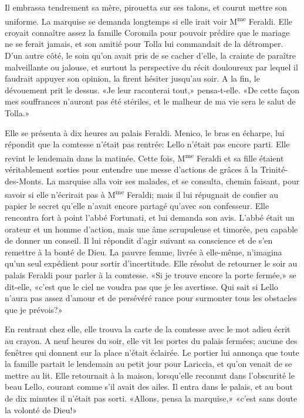 Il embrassa tendrement sa mère, pirouetta sur ses talons, et courut
mettre son uniforme. La marquise se demanda longtemps si elle irait voir
M\textsuperscript{me} Feraldi. Elle croyait connaître assez la famille
Coromila pour pouvoir prédire que le mariage ne se ferait jamais, et son
amitié pour Tolla lui commandait de la détromper. D'un autre côté, le
soin qu'on avait pris de se cacher d'elle, la crainte de paraître
malveillante ou jalouse, et surtout la perspective du récit douloureux
par lequel il faudrait appuyer son opinion, la firent hésiter jusqu'au
soir. A la fin, le dévouement prit le dessus. «Je leur raconterai tout,»
pensa-t-elle. «De cette façon mes souffrances n'auront pas été stériles,
et le malheur de ma vie sera le salut de Tolla.»

Elle se présenta à dix heures au palais Feraldi. Menico, le bras en
écharpe, lui répondit que la comtesse n'était pas rentrée: Lello n'était
pas encore parti. Elle revint le lendemain dans la matinée. Cette fois,
M\textsuperscript{me} Feraldi et sa fille étaient véritablement sorties
pour entendre une messe d'actions de grâces à la Trinité-des-Monts. La
marquise alla voir ses malades, et se consulta, chemin faisant, pour
savoir si elle n'écrirait pas à M\textsuperscript{me} Feraldi; mais il
lui répugnait de confier au papier le secret qu'elle n'avait encore
partagé qu'avec son confesseur. Elle rencontra fort à point l'abbé
Fortunati, et lui demanda son avis. L'abbé était un orateur et un homme
d'action, mais une âme scrupuleuse et timorée, peu capable de donner un
conseil. Il lui répondit d'agir suivant sa conscience et de s'en
remettre à la bonté de Dieu. La pauvre femme, livrée à elle-même,
n'imagina qu'un seul expédient pour sortir d'incertitude. Elle résolut
de retourner le soir au palais Feraldi pour parler à la comtesse. «Si je
trouve encore la porte fermée,» se dit-elle, «c'est que le ciel ne
voudra pas que je les avertisse. Qui sait si Lello n'aura pas assez
d'amour et de persévéré rance pour surmonter tous les obstacles que je
prévois?»

En rentrant chez elle, elle trouva la carte de la comtesse avec le mot
adieu écrit au crayon. A neuf heures du soir, elle vit les portes du
palais fermées; aucune des fenêtres qui donnent sur la place n'était
éclairée. Le portier lui annonça que toute la famille partait le
lendemain au petit jour pour Lariccia, et qu'on venait de se mettre au
lit. Elle retournait à la maison, lorsqu'elle reconnut dans l'obscurité
le beau Lello, courant comme s'il avait des ailes. Il entra dans le
palais, et au bout de dix minutes il n'était pas sorti. «Allons, pensa
la marquise,» «c'est sans doute la volonté de Dieu!»

